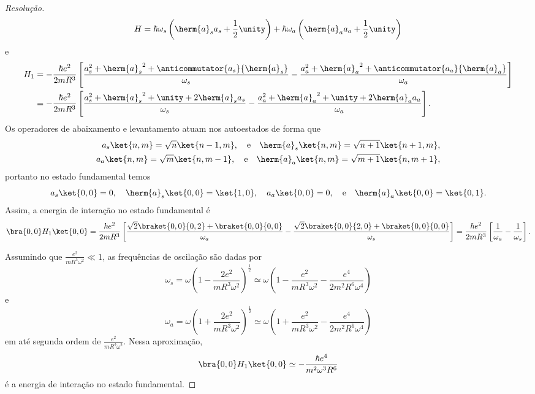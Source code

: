 \begin{proof}[Resolução]
    \begin{equation*}
        H = \hbar \omega_s\left(\herm{a}_sa_s +  \frac12 \unity\right) + \hbar \omega_a \left(\herm{a}_aa_a + \frac12\unity\right)
    \end{equation*}
    e
    \begin{align*}
        H_1 &=-\frac{\hbar e^2}{2m R^3} \left[\frac{a_s^2 + {\herm{a}_s}^2  + \anticommutator{a_s}{\herm{a}_s}}{\omega_s} - \frac{a_a^2 + {\herm{a}_a}^2  + \anticommutator{a_a}{\herm{a}_a}}{\omega_a}\right]\\
            &=-\frac{\hbar e^2}{2m R^3} \left[\frac{a_s^2 + {\herm{a}_s}^2  + \unity + 2\herm{a}_sa_s}{\omega_s} - \frac{a_a^2 + {\herm{a}_a}^2  + \unity + 2\herm{a}_aa_a}{\omega_a}\right].
    \end{align*}
    Os operadores de abaixamento e levantamento atuam nos autoestados de forma que
    \begin{align*}
        a_s\ket{n,m} = \sqrt{n}\ket{n-1,m},\quad\text{e}\quad
        \herm{a}_s\ket{n,m} = \sqrt{n+1}\ket{n+1, m},\\
        a_a\ket{n,m} = \sqrt{m}\ket{n,m-1},\quad\text{e}\quad
        \herm{a}_a\ket{n,m} = \sqrt{m+1}\ket{n, m+1},
    \end{align*}
    portanto no estado fundamental temos
    \begin{equation*}
        a_s\ket{0,0} = 0,\quad
        \herm{a}_s\ket{0,0} = \ket{1, 0},\quad
        a_a\ket{0,0} = 0,\quad\text{e}\quad
        \herm{a}_a\ket{0,0} = \ket{0, 1}.
    \end{equation*}
    Assim, a energia de interação no estado fundamental é
    \begin{equation*}
        \bra{0,0}H_1\ket{0,0} =\frac{\hbar  e^2}{2m R^3}\left[\frac{\sqrt{2}\braket{0,0}{0,2} + \braket{0,0}{0,0}}{\omega_a} - \frac{\sqrt{2}\braket{0,0}{2,0} + \braket{0,0}{0,0}}{\omega_s} \right] =\frac{\hbar e^2}{2m R^3} \left[\frac{1}{\omega_a} - \frac{1}{\omega_s}\right].
    \end{equation*}

    Assumindo que \(\frac{e^2}{mR^3 \omega^2} \ll 1\), as frequências de oscilação são dadas por
    \begin{equation*}
        \omega_s = \omega \left(1 - \frac{2e^2}{mR^3 \omega^2}\right)^{\frac12} \simeq \omega \left(1 - \frac{e^2}{mR^3\omega^2} - \frac{e^4}{2m^2 R^6 \omega^4}\right)
    \end{equation*}
    e
    \begin{equation*}
        \omega_a = \omega \left(1 + \frac{2e^2}{mR^3 \omega^2}\right)^{\frac12} \simeq \omega \left(1 + \frac{e^2}{mR^3\omega^2} - \frac{e^4}{2m^2 R^6 \omega^4}\right)
    \end{equation*}
    em até segunda ordem de \(\frac{e^2}{mR^3 \omega^2}\). Nessa aproximação,
    \begin{equation*}
        \bra{0,0}H_1\ket{0,0} \simeq -\frac{\hbar e^4}{m^2 \omega^3 R^6}
    \end{equation*}
    é a energia de interação no estado fundamental.
\end{proof}
